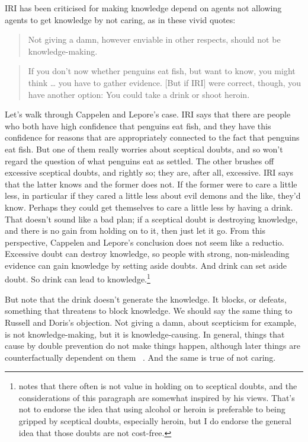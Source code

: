 IRI has been criticised for making knowledge depend on agents not allowing agents to get knowledge by not caring, as in these vivid quotes:

\begin{quote}

Not giving a damn, however enviable in other respects, should not be know\-ledge-making. ~\citep[433]{RussellDoris2008}
\end{quote}
\begin{quote}

If you don't now whether penguins eat fish, but want to know, you might think {\ldots} you have to gather evidence. [But if IRI] were correct, though, you have another option: You could take a drink or shoot heroin. ~\citep[1044--5]{CappelenLepore2006}
\end{quote}
Let's walk through Cappelen and Lepore's case. IRI says that there are people who both have high confidence that penguins eat fish, and they have this confidence for reasons that are appropriately connected to the fact that penguins eat fish. But one of them really worries about sceptical doubts, and so won't regard the question of what penguins eat as settled. The other brushes off excessive sceptical doubts, and rightly so; they are, after all, excessive. IRI says that the latter knows and the former does not. If the former were to care a little less, in particular if they cared a little less about evil demons and the like, they'd know. Perhaps they could get themselves to care a little less by having a drink. That doesn't sound like a bad plan; if a sceptical doubt is destroying knowledge, and there is no gain from holding on to it, then just let it go. From this perspective, Cappelen and Lepore's conclusion does not seem like a reductio. Excessive doubt can destroy knowledge, so people with strong, non-misleading evidence can gain knowledge by setting aside doubts. And drink can set aside doubt. So drink can lead to knowledge.\footnote{ \citet{Wright2004} notes that there often is not value in holding on to sceptical doubts, and the considerations of this paragraph are somewhat inspired by his views. That's not to endorse the idea that using alcohol or heroin is preferable to being gripped by sceptical doubts, especially heroin, but I do endorse the general idea that those doubts are not cost-free.}

But note that the drink doesn't generate the knowledge. It blocks, or defeats, something that threatens to block knowledge. We should say the same thing to Russell and Doris's objection. Not giving a damn, about scepticism for example, is not knowledge-making, but it is knowledge-causing. In general, things that cause by double prevention do not make things happen, although later things are counterfactually dependent on them ~\citep{Lewis2004a}. And the same is true of not caring.

